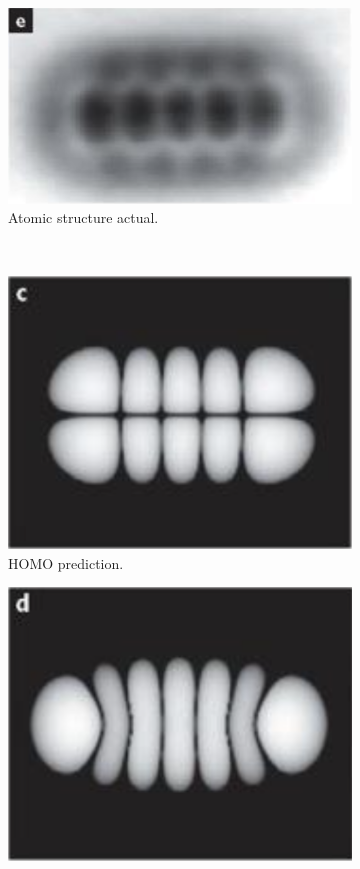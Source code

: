 \documentclass[../notes.tex]{subfiles}
\begin{document}
\begin{itemize}
\begin{figure}[h!]
\begin{subfigure}[b]{0.3\linewidth}
            \label{fig:MO-pictureb}
        \end{subfigure}
        \begin{subfigure}[b]{0.3\linewidth}
            \centering
            \includegraphics[width=0.8\linewidth]{../ExtFiles/MO-picturec.png}
            \caption{Atomic structure actual.}
            \label{fig:MO-picturec}
        \end{subfigure}\\[1em]
        \begin{subfigure}[b]{0.3\linewidth}
            \centering
            \includegraphics[width=0.8\linewidth]{../ExtFiles/MO-pictured.png}
            \caption{HOMO prediction.}
            \label{fig:MO-pictured}
        \end{subfigure}
        \begin{subfigure}[b]{0.3\linewidth}
            \centering
            \includegraphics[width=0.8\linewidth]{../ExtFiles/MO-picturee.png}

\end{subfigure}
\end{figure}
\end{itemize}
\end{document}
